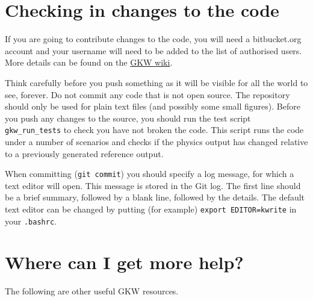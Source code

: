 \documentclass[a4paper,10pt]{article}
\begin{document}
\section{Checking in changes to the code}

If you are going to contribute changes to the code, you will need a bitbucket.org account and your username will need to be added to the list of authorised users.  More details can be found on the \href{https://bitbucket.org/gkw/gkw/wiki/Git_Bitbucket}{GKW wiki}.

Think carefully before you push something as it will be visible for all the world to see, forever.  Do not commit any code that is not open source.  The repository should only be used for plain text files (and possibly some small figures).  Before you push any changes to the source, you should run the test script \texttt{gkw\_run\_tests} to check you have not broken the code.  This script runs the code under a number of scenarios and checks if the physics output has changed relative to a previously generated reference output.

When committing (\texttt{git commit}) you should specify a log message, for which a text editor will open.  This message is stored in the Git log. The first line should be a brief summary, followed by a blank line, followed by the details.   The default text editor can be changed by putting (for example) \texttt{export EDITOR=kwrite} in your \texttt{.bashrc}.

\section{Where can I get more help?}

The following are other useful GKW resources.
\end{document}
